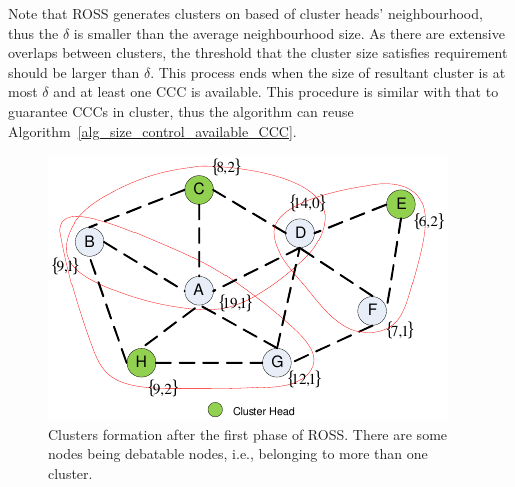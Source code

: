 \documentclass[10pt,journal,compsoc]{IEEEtran}
\theoremstyle{mytheoremstyle}
\theoremstyle{mytheoremstyle}
\theoremstyle{mytheoremstyle}
\newcommand{\ie}{i.e., }
\begin{document}
Note that ROSS generates clusters on based of cluster heads' neighbourhood, thus the $\delta$ is smaller than the average neighbourhood size.
As there are extensive overlaps between clusters, the threshold that the cluster size satisfies requirement should be larger than $\delta$.
This process ends when the size of resultant cluster is at most $\delta$ and at least one CCC is available.
This procedure is similar with that to guarantee CCCs in cluster, thus the algorithm can reuse Algorithm~\ref{alg_size_control_available_CCC}.






\begin{figure}[ht!]
  \centering
  \includegraphics[width=0.6\linewidth]{figure2.pdf}
  \caption{Clusters formation after the first phase of ROSS. There are some nodes being debatable nodes, \ie belonging to more than one cluster.}
  \label{fig2}
\end{figure}
\end{document}
